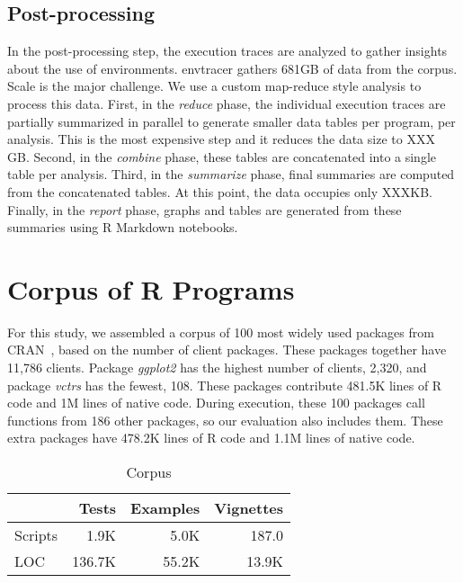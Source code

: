 \documentclass[10pt,review,sigplan,anonymous=true,authorversion=true,nonacm=true]{acmart}
\newcommand{\envtracer}{{\sf envtracer}\xspace}
\newcommand{\ggplot}{\textit{ggplot2}\xspace}
\newcommand{\vctrs}{\textit{vctrs}\xspace}
\begin{document}
\subsection{Post-processing}
In the post-processing step, the execution traces are analyzed to gather
insights about the use of environments. \envtracer gathers 681GB of data from
the corpus. Scale is the major challenge. We use a custom map-reduce style
analysis to process this data. First, in the \textit{reduce} phase, the
individual execution traces are partially summarized in parallel to generate
smaller data tables per program, per analysis. This is the most expensive step
and it reduces the data size to XXX GB. Second, in the \textit{combine} phase,
these tables are concatenated into a single table per analysis. Third, in the
\textit{summarize} phase, final summaries are computed from the concatenated
tables. At this point, the data occupies only XXXKB. Finally, in the
\textit{report} phase, graphs and tables are generated from these summaries
using R Markdown notebooks\cite{rmdpkg, rmdguide, rmdcookbook}.

\section{Corpus of R Programs}

For this study, we assembled a corpus of 100 most widely used packages from
CRAN~\cite{ligges2017}, based on the number of client packages. These packages
together have 11,786 clients. Package \ggplot has the highest number of clients,
2,320, and package \vctrs has the fewest, 108. These packages contribute 481.5K
lines of R code and 1M lines of native code. During execution, these 100
packages call functions from 186 other packages, so our evaluation also includes
them. These extra packages have 478.2K lines of R code and 1.1M lines of native
code.


\begin{table}[!h]
  \vspace{-3mm}
  \small
  \centering
  \caption{Corpus}\label{table:corpus}
  \vspace{-3mm}
  \begin{tabular}{lrrr}
    \toprule
    &\bf Tests&\bf Examples&\bf Vignettes\\
    \midrule
    {Scripts}&1.9K&5.0K&187.0\\
    \midrule
    {LOC}&136.7K&55.2K&13.9K\\
    \bottomrule
  \end{tabular}
\end{table}
\end{document}
